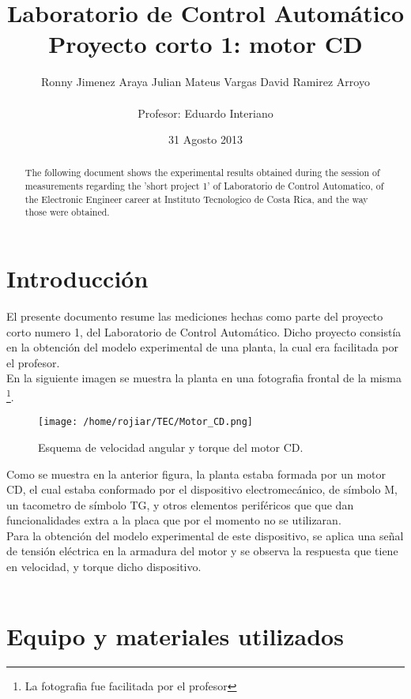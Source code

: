 \documentclass[a4paper,10pt,twocolumn]{article}
\title{\textbf{Laboratorio de Control Automático} \\ \textbf{Proyecto corto 1: motor CD}}
\author{Ronny Jimenez Araya \hspace*{1cm} Julian Mateus Vargas \hspace*{1cm} David Ramirez Arroyo\\
\\Profesor: Eduardo Interiano}
\date{31 Agosto 2013}
\begin{document}
\maketitle
\renewcommand{\figurename}{Figura}

\begin{abstract}

The following document shows the experimental results obtained during the session of measurements regarding the 'short project 1' 
of Laboratorio de Control Automatico, of the Electronic Engineer career at Instituto Tecnologico de Costa Rica, 
and the way those were obtained. 
\end{abstract}

\section{Introducción}

El presente documento resume las mediciones hechas como parte del proyecto corto numero 1, del Laboratorio de Control Automático.
Dicho proyecto consistía en la obtención del modelo experimental de una planta, la cual era facilitada por el profesor.\\

En la siguiente imagen se muestra la planta en una fotografia frontal de la misma \footnote{La fotografia fue facilitada por el profesor}.

\begin{figure}[h!]
\centering
\texttt{[image: /home/rojiar/TEC/Motor\_CD.png]}
\caption{Esquema de velocidad angular y torque del motor CD.}
\label{Esquema de velocidad angular y torque del motor CD utilizado}
\end{figure}

Como se muestra en la anterior figura, la planta estaba formada por un motor CD, el cual estaba conformado por el dispositivo electromecánico,
de símbolo M, un tacometro de símbolo TG, y otros elementos periféricos que que dan funcionalidades extra a la placa que por el momento no se 
utilizaran.\\

Para la obtención del modelo experimental de este dispositivo, se aplica una señal de tensión eléctrica en la armadura del motor y se observa la 
respuesta que tiene en velocidad, y torque dicho dispositivo. \\ \\

\section{Equipo y materiales utilizados}
\end{document}
